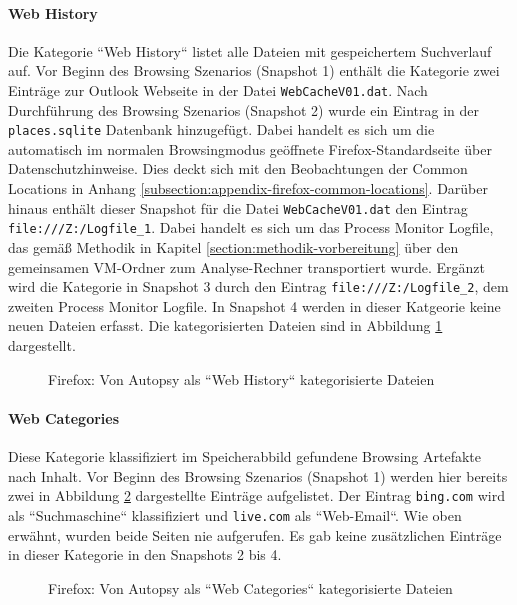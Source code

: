 \begin{appendices}
\paragraph*{Web History}
Die Kategorie ``Web History`` listet alle Dateien mit gespeichertem Suchverlauf auf. Vor Beginn des Browsing Szenarios (Snapshot 1) enthält die Kategorie zwei Einträge zur Outlook Webseite in der Datei \texttt{WebCacheV01.dat}. Nach Durchführung des Browsing Szenarios (Snapshot 2) wurde ein Eintrag in der \texttt{places.sqlite} Datenbank hinzugefügt. Dabei handelt es sich um die automatisch im normalen Browsingmodus geöffnete Firefox-Standardseite über Datenschutzhinweise. Dies deckt sich mit den Beobachtungen der Common Locations in Anhang \ref{subsection:appendix-firefox-common-locations}. Darüber hinaus enthält dieser Snapshot für die Datei \texttt{WebCacheV01.dat} den Eintrag \texttt{file:///Z:/Logfile\_1}. Dabei handelt es sich um das Process Monitor Logfile, das gemäß Methodik in Kapitel \ref{section:methodik-vorbereitung} über den gemeinsamen VM-Ordner zum Analyse-Rechner transportiert wurde. Ergänzt wird die Kategorie in Snapshot 3 durch den Eintrag \texttt{file:///Z:/Logfile\_2}, dem zweiten Process Monitor Logfile. In Snapshot 4 werden in dieser Katgeorie keine neuen Dateien erfasst. Die kategorisierten Dateien sind in Abbildung \ref{img:firefox-web-history} dargestellt.
\begin{figure}[h!]
	\centerline{}
	\caption{Firefox: Von Autopsy als ``Web History`` kategorisierte Dateien}
	\label{img:firefox-web-history}  
\end{figure}

\paragraph*{Web Categories}
Diese Kategorie klassifiziert im Speicherabbild gefundene Browsing Artefakte nach Inhalt.
Vor Beginn des Browsing Szenarios (Snapshot 1) werden hier bereits zwei in Abbildung \ref{img:firefox-web-categories} dargestellte Einträge aufgelistet. Der Eintrag \texttt{bing.com} wird als ``Suchmaschine`` klassifiziert und \texttt{live.com} als ``Web-Email``.
Wie oben erwähnt, wurden beide Seiten nie aufgerufen. Es gab keine zusätzlichen Einträge in dieser Kategorie in den Snapshots 2 bis 4.
\begin{figure}[h!]
	\centerline{}
	\caption{Firefox: Von Autopsy als ``Web Categories`` kategorisierte Dateien}
	\label{img:firefox-web-categories}  
\end{figure}


\end{appendices}
